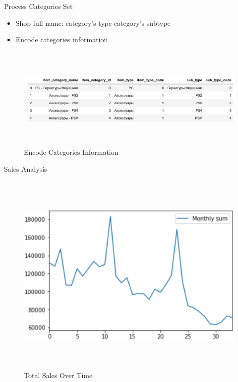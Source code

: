 \documentclass[
size=12pt,
paper=smartboard,  %
mode=present, 		%
display=slides, 	%
style=tuliplab,  	%
pauseslide,
fleqn,leqno]{powerdot}
\begin{document}
	\begin{slide}[toc=Process Categories Set]{Process Categories Set}
		\begin{itemize}
			\item Shop full name: category's type-category's subtype
			\item Encode categories information
		\end{itemize}
		\begin{figure}[htb]
			\centering
			\includegraphics[width=19cm, height=5cm]{figures/category code.eps}
			\caption{Encode Categories Information
			}\label{straddltimeScale}
		\end{figure}
	\end{slide}
	\begin{slide}[toc=Sales Analysis]{Sales Analysis}
		\begin{figure}[htb]
			\centering
			\includegraphics[width=15cm, height=10cm]{figures/sum.eps}
			\caption{Total Sales Over Time
			}\label{straddltimeScale}
		\end{figure}
	\end{slide}
\end{document}

